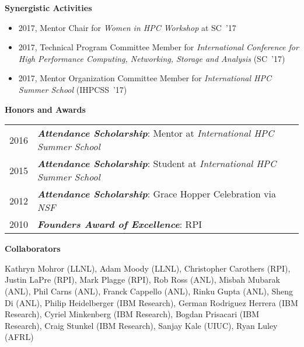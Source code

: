 \documentclass[times,11pt]{article}    %
\begin{document}
\vskip 3pt
\textbf{\sffamily Synergistic Activities}

\begin{itemize}
\item 2017, Mentor Chair for {\em Women in HPC Workshop} at SC~'17
\item 2017, Technical Program Committee Member for {\em International Conference for High Performance Computing, Networking, Storage and Analysis} (SC~'17)
\item 2017, Mentor Organization Committee Member for {\em International HPC Summer School} (IHPCSS~'17)
\end{itemize}

\vskip 6pt
\textbf{\sffamily Honors and Awards}
\vskip 6pt

\begin{tabular}{ll}
2016 & {\em \bf Attendance Scholarship}: Mentor at {\em International HPC Summer School}\\
2015 & {\em \bf Attendance Scholarship}: Student at {\em International HPC Summer School}\\
2012 & {\em \bf Attendance Scholarship}: Grace Hopper Celebration via {\em NSF}\\
2010 & {\em \bf Founders Award of Excellence}: RPI
\end{tabular}
\vskip 6pt

\textbf{\sffamily Collaborators}

Kathryn Mohror (LLNL), Adam Moody (LLNL),
Christopher Carothers (RPI), Justin LaPre (RPI), Mark Plagge (RPI),
Rob Ross (ANL), Misbah Mubarak (ANL), Phil Carns (ANL),
Franck Cappello (ANL), Rinku Gupta (ANL), Sheng Di (ANL),
Philip Heidelberger (IBM Research), German Rodriguez Herrera (IBM Research), Cyriel Minkenberg (IBM Research), Bogdan Prisacari (IBM Research), Craig Stunkel (IBM Research),
Sanjay Kale (UIUC),
Ryan Luley (AFRL)



\end{document}
